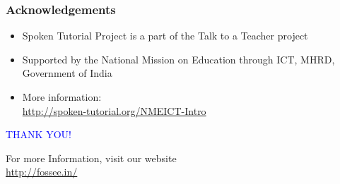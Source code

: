 \documentclass[17pt]{beamer}
\begin{document}
\begin{frame}
\frametitle{Acknowledgements}
\begin{itemize}
\item Spoken Tutorial Project is a part of the Talk to a Teacher  project 
\item Supported by the National Mission on Education through  ICT, MHRD, Government of India 
\item More information: \\{\color{blue}\url{http://spoken-tutorial.org/NMEICT-Intro}}
\end{itemize}
\end{frame}
\begin{frame}

  \begin{block}{}
  \begin{center}
  \textcolor{blue}{\Large THANK YOU!} 
  \end{center}
  \end{block}
\begin{block}{}
  \begin{center}
    For more Information, visit our website\\
    {\color{blue}\url{http://fossee.in/}}
  \end{center}  
  \end{block}
\end{frame}
\end{document}
